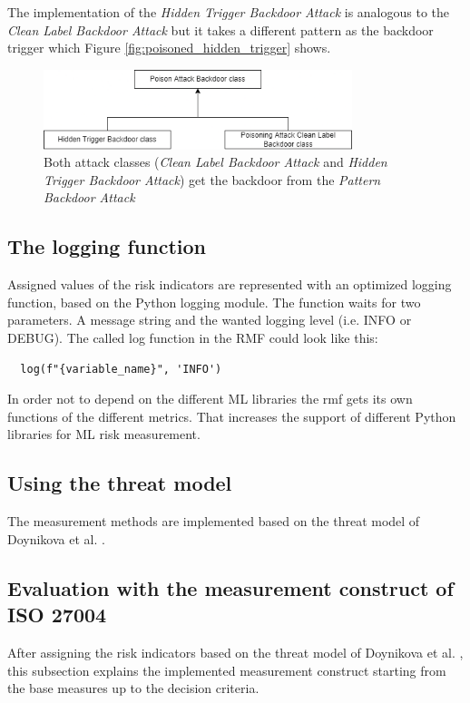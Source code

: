 The implementation of the \textit{Hidden Trigger Backdoor Attack} is analogous to the \textit{Clean Label Backdoor Attack} but it takes a different pattern as the backdoor trigger which Figure \ref{fig:poisoned_hidden_trigger} shows.

\begin{figure}[ht!]
  \centering
  \includegraphics[width=9cm]{pictures/attack_relationship.png}
  \caption{Both attack classes (\textit{Clean Label Backdoor Attack} and \textit{Hidden Trigger Backdoor Attack}) get the backdoor from the \textit{Pattern Backdoor Attack}}
  \label{fig:relation_risk_ind}
\end{figure}

\subsection{The logging function}

Assigned values of the risk indicators are represented with an optimized logging function, based on the Python logging module. The function waits for two parameters. A message string and the wanted logging level (i.e. INFO or DEBUG). The called log function in the RMF could look like this:
\begin{lstlisting}
  log(f"{variable_name}", 'INFO')
\end{lstlisting}

In order not to depend on the different ML libraries the rmf gets its own functions of the different metrics. That increases the support of different Python libraries for ML risk
measurement.

\subsection{Using the threat model}
The measurement methods are implemented based on the threat model of Doynikova et al. \cite{DBLP:conf/crisis/DoynikovaNGK20}.
\subsection{Evaluation with the measurement construct of ISO 27004}

After assigning the risk indicators based on the threat model of Doynikova et al. \cite{DBLP:conf/crisis/DoynikovaNGK20}, this subsection explains the implemented measurement construct starting from the base measures up to the decision criteria. \\

